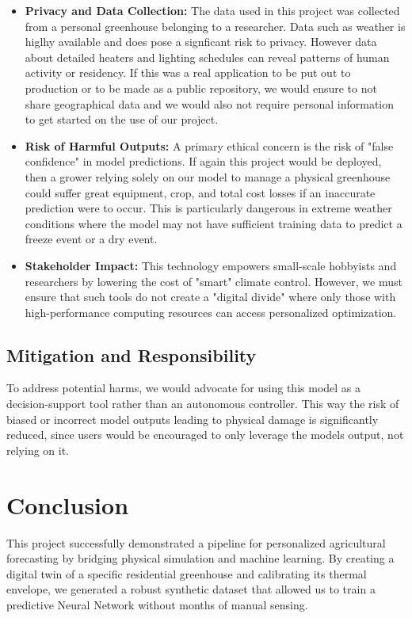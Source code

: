\documentclass{article}
\begin{document}
\begin{itemize}
    \item \textbf{Privacy and Data Collection:} The data used in this project was collected from a personal greenhouse belonging to a researcher. Data such as weather is higlhy available and does pose a signficant risk to privacy. However data about detailed heaters and lighting schedules can  reveal patterns of human activity or residency. If this was a real application to be put out to production or to be made as a public repository, we would ensure to not share geographical data and we would also not require personal information to get started on the use of our project.
    
    \item \textbf{Risk of Harmful Outputs:} A primary ethical concern is the risk of "false confidence" in model predictions. If again this project would be deployed, then a grower relying solely on our model to manage a physical greenhouse could suffer great equipment, crop, and total cost losses if an inaccurate prediction were to occur. This is particularly dangerous in extreme weather conditions where the model may not have sufficient training data to predict a freeze event or a dry event.
    
    \item \textbf{Stakeholder Impact:} This technology empowers small-scale hobbyists and researchers by lowering the cost of "smart" climate control. However, we must ensure that such tools do not create a "digital divide" where only those with high-performance computing resources can access personalized optimization.
\end{itemize}

\subsection{Mitigation and Responsibility}
To address potential harms, we would advocate for using this model as a decision-support tool rather than an autonomous controller. This way the risk of biased or incorrect model outputs leading to physical damage is significantly reduced, since users would be encouraged to only leverage the models output, not relying on it. 


\section{Conclusion}
This project successfully demonstrated a pipeline for personalized agricultural forecasting by bridging physical simulation and machine learning. By creating a digital twin of a specific residential greenhouse and calibrating its thermal envelope, we generated a robust synthetic dataset that allowed us to train a predictive Neural Network without months of manual sensing.
\end{document}
